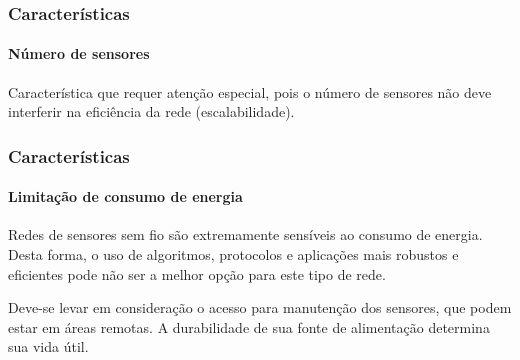 \documentclass[notes]{beamer}
\begin{document}
\begin{frame}
\frametitle{Características}
\framesubtitle{Número de sensores}

\begin{block}

Característica que requer atenção especial, pois o número de sensores não deve interferir na eficiência da rede (escalabilidade).
\end{block}

\end{frame}

\begin{frame}
\frametitle{Características}
\framesubtitle{Limitação de consumo de energia}

\begin{block}

Redes de sensores sem fio são extremamente sensíveis ao consumo de energia. Desta forma, o uso de algoritmos, protocolos e aplicações mais robustos e eficientes pode não ser a melhor opção para este tipo de rede. 

\end{block} \pause

\begin{block}

Deve-se levar em consideração o acesso para manutenção dos sensores, que podem estar em áreas remotas. A durabilidade de sua fonte de alimentação determina sua vida útil.

\end{block}

\end{frame}
\end{document}
